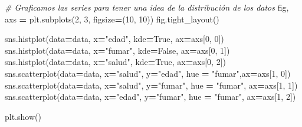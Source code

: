 \documentclass[
  a4paper,
  DIV=11,
  numbers=noendperiod]{scrreprt}
\newenvironment{Shaded}{\begin{snugshade}}{\end{snugshade}}
\newcommand{\CommentTok}[1]{\textcolor[rgb]{0.56,0.35,0.01}{\textit{#1}}}
\newcommand{\DecValTok}[1]{\textcolor[rgb]{0.00,0.00,0.81}{#1}}
\newcommand{\NormalTok}[1]{#1}
\newcommand{\OperatorTok}[1]{\textcolor[rgb]{0.81,0.36,0.00}{\textbf{#1}}}
\newcommand{\StringTok}[1]{\textcolor[rgb]{0.31,0.60,0.02}{#1}}
\newcommand{\VariableTok}[1]{\textcolor[rgb]{0.00,0.00,0.00}{#1}}
\begin{document}
\begin{Shaded}
\begin{Highlighting}[numbers=left,,]
\CommentTok{\# Graficamos las series para tener una idea de la distribución de los datos}
\NormalTok{fig, axs }\OperatorTok{=}\NormalTok{ plt.subplots(}\DecValTok{2}\NormalTok{, }\DecValTok{3}\NormalTok{, figsize}\OperatorTok{=}\NormalTok{(}\DecValTok{10}\NormalTok{, }\DecValTok{10}\NormalTok{))}
\NormalTok{fig.tight\_layout()}

\NormalTok{sns.histplot(data}\OperatorTok{=}\NormalTok{data, x}\OperatorTok{=}\StringTok{"edad"}\NormalTok{, kde}\OperatorTok{=}\VariableTok{True}\NormalTok{, ax}\OperatorTok{=}\NormalTok{axs[}\DecValTok{0}\NormalTok{, }\DecValTok{0}\NormalTok{])}
\NormalTok{sns.histplot(data}\OperatorTok{=}\NormalTok{data, x}\OperatorTok{=}\StringTok{"fumar"}\NormalTok{, kde}\OperatorTok{=}\VariableTok{False}\NormalTok{, ax}\OperatorTok{=}\NormalTok{axs[}\DecValTok{0}\NormalTok{, }\DecValTok{1}\NormalTok{])}
\NormalTok{sns.histplot(data}\OperatorTok{=}\NormalTok{data, x}\OperatorTok{=}\StringTok{"salud"}\NormalTok{, kde}\OperatorTok{=}\VariableTok{True}\NormalTok{, ax}\OperatorTok{=}\NormalTok{axs[}\DecValTok{0}\NormalTok{, }\DecValTok{2}\NormalTok{])}
\NormalTok{sns.scatterplot(data}\OperatorTok{=}\NormalTok{data, x}\OperatorTok{=}\StringTok{"salud"}\NormalTok{, y}\OperatorTok{=}\StringTok{"edad"}\NormalTok{, hue }\OperatorTok{=} \StringTok{"fumar"}\NormalTok{,ax}\OperatorTok{=}\NormalTok{axs[}\DecValTok{1}\NormalTok{, }\DecValTok{0}\NormalTok{])}
\NormalTok{sns.scatterplot(data}\OperatorTok{=}\NormalTok{data, x}\OperatorTok{=}\StringTok{"salud"}\NormalTok{, y}\OperatorTok{=}\StringTok{"fumar"}\NormalTok{, hue }\OperatorTok{=} \StringTok{"fumar"}\NormalTok{, ax}\OperatorTok{=}\NormalTok{axs[}\DecValTok{1}\NormalTok{, }\DecValTok{1}\NormalTok{])}
\NormalTok{sns.scatterplot(data}\OperatorTok{=}\NormalTok{data, x}\OperatorTok{=}\StringTok{"edad"}\NormalTok{, y}\OperatorTok{=}\StringTok{"fumar"}\NormalTok{, hue }\OperatorTok{=} \StringTok{"fumar"}\NormalTok{, ax}\OperatorTok{=}\NormalTok{axs[}\DecValTok{1}\NormalTok{, }\DecValTok{2}\NormalTok{])}

\NormalTok{plt.show()}
\end{Highlighting}
\end{Shaded}
\end{document}
